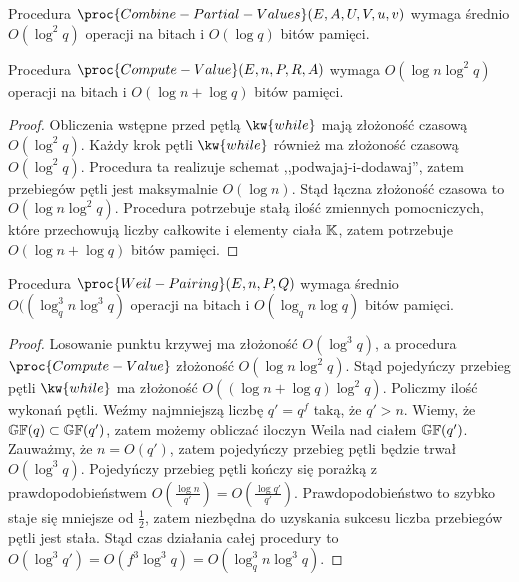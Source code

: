 \begin{fact}
Procedura $\proc{Combine-Partial-Values}(E, A, U, V, u, v)$ wymaga średnio
\linebreak $O(\log^2 q)$ operacji na bitach i $O(\log q)$ bitów pamięci.
\end{fact}

\begin{lemma}
Procedura $\proc{Compute-Value}(E, n, P, R, A)$ wymaga
$O(\log n \log^2 q)$ operacji na bitach i $O(\log n + \log q)$ bitów pamięci.
\end{lemma}

\begin{proof}
Obliczenia wstępne przed pętlą $\kw{while}$ mają złożoność czasową $O(\log^2 q)$.
Każdy krok pętli $\kw{while}$ również ma złożoność czasową $O(\log^2 q)$.
Procedura ta realizuje schemat ,,podwajaj-i-dodawaj'',
zatem przebiegów pętli jest maksymalnie $O(\log n)$.
Stąd łączna złożoność czasowa to $O(\log n \log^2q)$.
Procedura potrzebuje stałą ilość zmiennych pomocniczych,
które przechowują liczby całkowite i elementy ciała $\mathbb{K}$,
zatem potrzebuje $O(\log n + \log q)$ bitów pamięci.
\end{proof}

\begin{theorem}
Procedura $\proc{Weil-Pairing}(E, n, P, Q)$ wymaga średnio
$O((\log_q^3 n \log^3 q)$ operacji na bitach i $O(\log_q n \log q)$ bitów pamięci.
\end{theorem}

\begin{proof}
Losowanie punktu krzywej ma złożoność $O(\log^3 q)$,
a procedura $\proc{Compute-Value}$ złożoność $O(\log n \log^2 q)$.
Stąd pojedyńczy przebieg pętli $\kw{while}$ ma złożoność
$O((\log n + \log q)\log^2 q)$.
Policzmy ilość wykonań pętli.
Weźmy najmniejszą liczbę $q' = q^f$ taką, że $q' > n$.
Wiemy, że $\mathbb{GF}(q) \subset \mathbb{GF}(q')$, zatem możemy obliczać iloczyn Weila
nad ciałem $\mathbb{GF}(q')$.
Zauważmy, że $n = O(q')$, zatem pojedyńczy przebieg pętli będzie trwał
$O(\log^3 q)$.
Pojedyńczy przebieg pętli kończy się porażką z prawdopodobieństwem
$O(\frac{\log n}{q'}) = O(\frac{\log q'}{q'})$.
Prawdopodobieństwo to szybko staje się mniejsze od $\frac{1}{2}$,
zatem niezbędna do uzyskania sukcesu liczba przebiegów pętli jest stała.
Stąd czas działania całej procedury to
$O(\log^3 q') = O(f^3 \log^3 q) = O(\log_q^3 n \log^3 q)$.
\end{proof}
